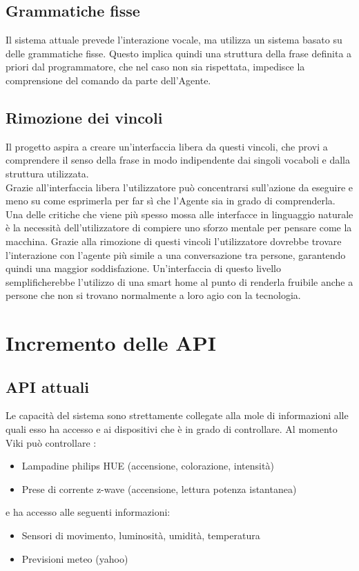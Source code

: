 \documentclass[twoside]{supsistudent}
\begin{document}
\subsection{Grammatiche fisse}
Il sistema attuale prevede l'interazione vocale, ma utilizza un sistema basato su delle grammatiche fisse. Questo implica quindi una struttura della frase definita a priori dal programmatore, che nel caso non sia rispettata, impedisce la comprensione del comando da parte dell'Agente.
\subsection{Rimozione dei vincoli}
Il progetto aspira a creare un'interfaccia libera da questi vincoli, che provi a comprendere il senso della frase in modo indipendente dai singoli vocaboli e dalla struttura utilizzata.\\
Grazie all'interfaccia libera l'utilizzatore può concentrarsi sull'azione da eseguire e meno su come esprimerla per far sì che l'Agente sia in grado di comprenderla. Una delle critiche che viene più spesso mossa alle interfacce in linguaggio naturale è la necessità dell'utilizzatore di compiere uno sforzo mentale per pensare come la macchina.
Grazie alla rimozione di questi vincoli l'utilizzatore dovrebbe trovare l'interazione con l'agente più simile a una conversazione tra persone, garantendo quindi una maggior soddisfazione.
Un'interfaccia di questo livello semplificherebbe l'utilizzo di una smart home al punto di renderla fruibile anche a persone che non si trovano normalmente a loro agio con la tecnologia.
\section{Incremento delle API}
\subsection{API attuali}
Le capacità del sistema sono strettamente collegate alla mole di informazioni alle quali esso ha accesso e ai dispositivi che è in grado di controllare. 
Al momento Viki può controllare :
\begin{itemize}
  \item Lampadine philips HUE (accensione, colorazione, intensità)
  \item Prese di corrente z-wave (accensione, lettura potenza istantanea)
\end{itemize}
e ha accesso alle seguenti informazioni:
\begin{itemize}
  \item Sensori di movimento, luminosità, umidità, temperatura
  \item Previsioni meteo (yahoo)
\end{itemize}
\end{document}
